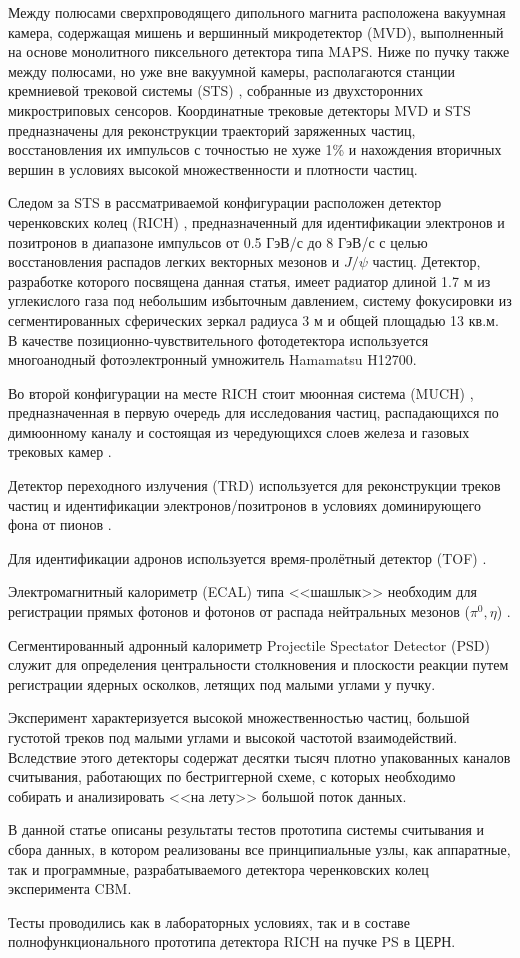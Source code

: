 Между полюсами сверхпроводящего дипольного магнита \cite{} расположена вакуумная камера, содержащая мишень и вершинный микродетектор (MVD), выполненный на основе монолитного пиксельного детектора типа MAPS. Ниже по пучку также между полюсами, но уже вне вакуумной камеры, располагаются станции кремниевой трековой системы (STS) \cite{}, собранные из двухсторонних микростриповых сенсоров. Координатные трековые детекторы MVD и STS предназначены для реконструкции траекторий заряженных частиц, восстановления их импульсов с точностью не хуже 1\% и нахождения вторичных вершин в условиях высокой множественности и плотности частиц.

Следом за STS в рассматриваемой конфигурации расположен детектор черенковских колец (RICH) \cite{}, предназначенный для идентификации электронов и позитронов в диапазоне импульсов от 0.5 ГэВ/с до 8 ГэВ/с с целью восстановления распадов легких векторных мезонов и $ J / \psi $ частиц. Детектор, разработке которого посвящена данная статья, имеет радиатор длиной 1.7 м из углекислого газа под небольшим избыточным давлением, систему фокусировки из сегментированных сферических зеркал радиуса 3 м и общей площадью 13 кв.м. В качестве позиционно-чувствительного фотодетектора используется многоанодный фотоэлектронный умножитель Hamamatsu H12700.

Во второй конфигурации на месте RICH стоит мюонная система (MUCH) \cite{}, предназначенная в первую очередь для исследования частиц, распадающихся по димюонному каналу и состоящая из чередующихся слоев железа и газовых трековых камер \cite{}.

Детектор переходного излучения (TRD) используется для реконструкции треков частиц и идентификации электронов/позитронов в условиях доминирующего фона от пионов \cite{}.

Для идентификации адронов используется время-пролётный детектор (TOF) \cite{}.

Электромагнитный калориметр (ECAL) типа <<шашлык>> необходим для регистрации прямых фотонов и фотонов от распада нейтральных мезонов ($ \pi^{0}, \eta $) \cite{}.

Сегментированный адронный калориметр Projectile Spectator Detector (PSD) \cite{} служит для определения центральности столкновения и плоскости реакции путем регистрации ядерных осколков, летящих под малыми углами у пучку.

Эксперимент характеризуется высокой множественностью частиц, большой густотой треков под малыми углами и высокой частотой взаимодействий. Вследствие этого детекторы содержат десятки тысяч плотно упакованных каналов считывания, работающих по бестриггерной схеме, с которых необходимо собирать и анализировать <<на лету>> большой поток данных.

В данной статье описаны результаты тестов прототипа системы считывания и сбора данных, в котором реализованы все принципиальные узлы, как аппаратные, так и программные, разрабатываемого детектора черенковских колец эксперимента CBM.

Тесты проводились как в лабораторных условиях, так и в составе полнофункционального прототипа детектора RICH на пучке PS в ЦЕРН.
